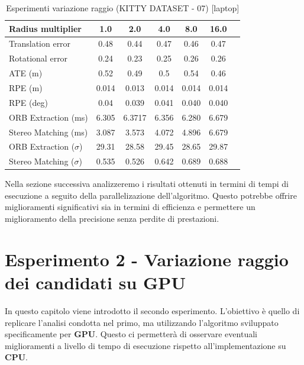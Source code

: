 \documentclass[12pt,a4paper]{report}
\begin{document}
\newpage
\begin{table}[h]
    \centering
    \caption{Esperimenti variazione raggio (KITTY DATASET - 07) [laptop] }
    \begin{tabular}{lcccccc}
        \toprule
        \rowcolor{gray!20}
        Radius multiplier & 1.0 & \cellcolor{orange!40}2.0 & 4.0 & 8.0 & 16.0 \\
        \midrule
        Translation error & 0.48 & \cellcolor{green!20}0.44 & 0.47 & 0.46 & 0.47 \\
        Rotational error  & 0.24 & \cellcolor{green!20}0.23 & 0.25 & 0.26 & 0.26 \\
        ATE (m)           & 0.52 & 0.49 & 0.5 & 0.54 & \cellcolor{green!20}0.46 \\
        RPE (m)           & 0.014 & \cellcolor{green!20}0.013 & 0.014 & 0.014 & 0.014 \\
        RPE (deg)         & 0.04 & \cellcolor{green!20}0.039 & 0.041 & 0.040 & 0.040 \\
        ORB Extraction (ms) & 6.305 & 6.3717 & 6.356 & \cellcolor{green!20}6.280 & 6.679 \\
        Stereo Matching (ms) & \cellcolor{green!20}3.087 & 3.573 & 4.072 & 4.896 & 6.679 \\
        ORB Extraction ($\sigma$) & 29.31 & \cellcolor{green!20}28.58 & 29.45 & 28.65 & 29.87 \\
        Stereo Matching ($\sigma$) & 0.535 & \cellcolor{green!20}0.526 & 0.642 & 0.689 & 0.688 \\
        \bottomrule
    \end{tabular}
\end{table}

Nella sezione successiva analizzeremo i risultati ottenuti in termini di tempi di esecuzione a seguito della parallelizazione  dell'algoritmo. Questo potrebbe offrire miglioramenti significativi sia in termini di efficienza e permettere un miglioramento della precisione senza perdite di prestazioni.


\newpage
\section{Esperimento 2 - Variazione raggio dei candidati su GPU }

In questo capitolo viene introdotto il secondo esperimento. L'obiettivo è quello di replicare l'analisi condotta nel primo, ma utilizzando l'algoritmo sviluppato specificamente per \textbf{GPU}. Questo ci permetterà di osservare eventuali miglioramenti a livello di tempo di esecuzione rispetto all'implementazione su \textbf{CPU}.
\end{document}
